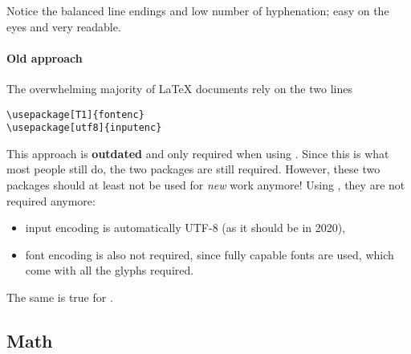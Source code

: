 Notice the balanced line endings and low number of hyphenation;
easy on the eyes and very readable.

\paragraph{Old approach}
The overwhelming majority of \LaTeX{} documents rely on the two lines
\begin{verbatim}
\usepackage[T1]{fontenc}
\usepackage[utf8]{inputenc}
\end{verbatim}
This approach is \textbf{outdated} and only required when using .
Since this is what most people still do, the two packages are still required.
However, these two packages should at least not be used for \emph{new} work anymore!
Using , they are not required anymore:
\begin{itemize}
    \item input encoding is automatically UTF-8 (as it should be in 2020),
    \item font encoding is also not required, since fully capable fonts are used,
        which come with all the glyphs required.
\end{itemize}
The same is true for .

\subsection{Math}

